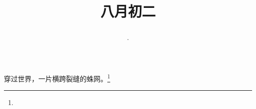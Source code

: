 \title{\date[d=4,m=9,y=2024][year:cn-y,年,month:cn,day:cn,日,·,weekday]·八月初二 }
穿过世界，一片横跨裂缝的蛛网。\footnote{ }

